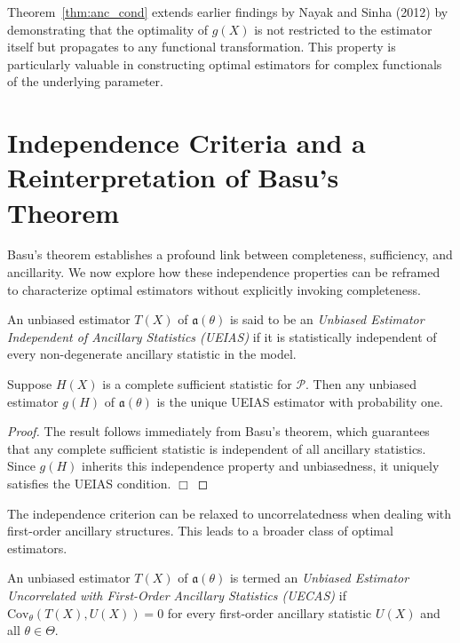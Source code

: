 \documentclass[twoside]{article}
\begin{document}
\begin{rem}
Theorem~\ref{thm:anc_cond} extends earlier findings by Nayak and Sinha (2012) by demonstrating that the optimality of $g(X)$ is not restricted to the estimator itself but propagates to any functional transformation. This property is particularly valuable in constructing optimal estimators for complex functionals of the underlying parameter.
\end{rem}

\section{Independence Criteria and a Reinterpretation of Basu's Theorem}\label{sec:basu}
Basu's theorem establishes a profound link between completeness, sufficiency, and ancillarity. We now explore how these independence properties can be reframed to characterize optimal estimators without explicitly invoking completeness.

\begin{dfn}\label{def:ueias}
An unbiased estimator $T(X)$ of $\mathfrak{a}(\theta)$ is said to be an \textit{Unbiased Estimator Independent of Ancillary Statistics (UEIAS)} if it is statistically independent of every non-degenerate ancillary statistic in the model.
\end{dfn}

\begin{thm}\label{thm:basu_ueias}
Suppose $H(X)$ is a complete sufficient statistic for $\mathcal{P}$. Then any unbiased estimator $g(H)$ of $\mathfrak{a}(\theta)$ is the unique UEIAS estimator with probability one.
\end{thm}
\begin{proof}
The result follows immediately from Basu's theorem, which guarantees that any complete sufficient statistic is independent of all ancillary statistics. Since $g(H)$ inherits this independence property and unbiasedness, it uniquely satisfies the UEIAS condition. \hfill $\Box$
\end{proof}

The independence criterion can be relaxed to uncorrelatedness when dealing with first-order ancillary structures. This leads to a broader class of optimal estimators.

\begin{dfn}\label{def:uecas}
An unbiased estimator $T(X)$ of $\mathfrak{a}(\theta)$ is termed an \textit{Unbiased Estimator Uncorrelated with First-Order Ancillary Statistics (UECAS)} if $\mathrm{Cov}_{\theta}(T(X), U(X)) = 0$ for every first-order ancillary statistic $U(X)$ and all $\theta \in \Theta$.
\end{dfn}
\end{document}

